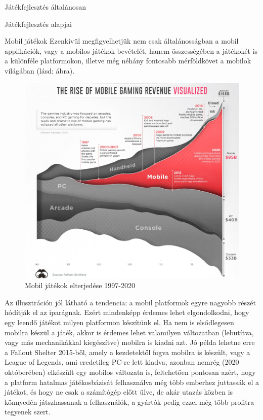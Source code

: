 \begin{MyChapter}{Játékfejlesztés általánosan}
\begin{MySection}{Játékfejlesztés alapjai}
\begin{MySubSection}{Mobil játékok}
		Ezenkívül megfigyelhetjük nem csak általánosságban a mobil applikációk, vagy a mobilos játékok bevételét, hanem összességében a játékokét is a különféle platformokon, illetve még néhány fontosabb mérföldkövet a mobilok világában (lásd:  ábra).
		\begin{figure}[h!]
			\centering
			\includegraphics[scale=0.34]{kepek/mobil/Rise_of_Mobile_Gaming_Visualized.jpg}
			\caption{Mobil játékok elterjedése 1997-2020}
			\label{fig:mobil:Rise_of_Mobile_Gaming_Visualized}
		\end{figure}
		
		Az illusztráción jól látható a tendencia: a mobil platformok egyre nagyobb részét hódítják el az iparágnak. Ezért mindenképp érdemes lehet elgondolkodni, hogy egy leendő játékot milyen platformon készítünk el. Ha nem is elsődlegesen mobilra készül a játék, akkor is érdemes lehet valamilyen változatban (lebutítva, vagy más mechanikákkal kiegészítve) mobilra is kiadni azt.
		Jó példa lehetne erre a Fallout Shelter 2015-ből, amely a kezdetektől fogva mobilra is készült, vagy a League of Legends, ami eredetileg PC-re lett kiadva, azonban nemrég (2020 októberében) elkészült egy mobilos változata is, feltehetően pontosan azért, hogy a platform hatalmas játékosbázisát felhasználva még több emberhez juttassák el a játékot, és hogy ne csak a számítógép előtt ülve, de akár utazás közben is könnyedén játszhassanak a felhasználók, a gyártók pedig ezzel még több profitra tegyenek szert.


\end{MySubSection}
\end{MySection}
\end{MyChapter}
